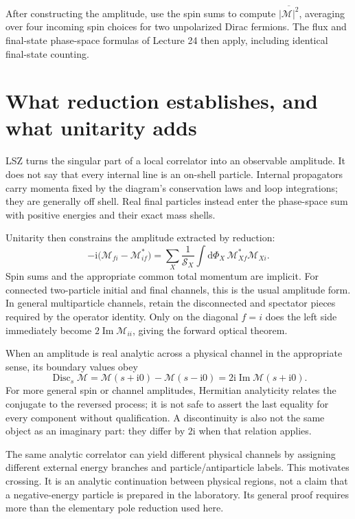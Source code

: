 \documentclass[11pt]{article}
\newcommand{\dd}{\mathrm d}
\newcommand{\ii}{\mathrm i}
\newcommand{\module}[1]{\clearpage\section{#1}}
\newcommand{\cM}{\mathcal M}
\newcommand{\cS}{\mathcal S}
\begin{document}
After constructing the amplitude, use the spin sums to compute
\(\overline{|\cM|^2}\), averaging over four incoming spin choices for two
unpolarized Dirac fermions. The flux and final-state phase-space formulas
of Lecture 24 then apply, including identical final-state counting.

\module{What reduction establishes, and what unitarity adds}
LSZ turns the singular part of a local correlator into an observable
amplitude. It does not say that every internal line is an on-shell particle.
Internal propagators carry momenta fixed by the diagram's conservation laws
and loop integrations; they are generally off shell. Real final particles
instead enter the phase-space sum with positive energies and their exact
mass shells.

Unitarity then constrains the amplitude extracted by reduction:
\begin{equation}
 -\ii\big(\cM_{fi}-\cM_{if}^*\big)
 =\sum_X\frac1{\cS_X}\int\dd\Phi_X\,
 \cM_{Xf}^*\cM_{Xi}.
 \label{eq:generalunitarity}
\end{equation}
Spin sums and the appropriate common total momentum are implicit.
For connected two-particle initial and final channels, this is the usual
amplitude form. In general multiparticle channels, retain the disconnected
and spectator pieces required by the operator identity. Only on the
diagonal \(f=i\) does the left side immediately become
\(2\operatorname{Im}\cM_{ii}\), giving the forward optical theorem.

When an amplitude is real analytic across a physical channel in the
appropriate sense, its boundary values obey
\begin{equation}
 \operatorname{Disc}_s\cM
 =\cM(s+\ii0)-\cM(s-\ii0)=2\ii\operatorname{Im}\cM(s+\ii0).
\end{equation}
For more general spin or channel amplitudes, Hermitian analyticity relates
the conjugate to the reversed process; it is not safe to assert the last
equality for every component without qualification. A discontinuity is
also not the same object as an imaginary part: they differ by \(2\ii\)
when that relation applies.

The same analytic correlator can yield different physical channels by
assigning different external energy branches and particle/antiparticle
labels. This motivates crossing. It is an analytic continuation between
physical regions, not a claim that a negative-energy particle is prepared
in the laboratory. Its general proof requires more than the elementary
pole reduction used here.
\end{document}
